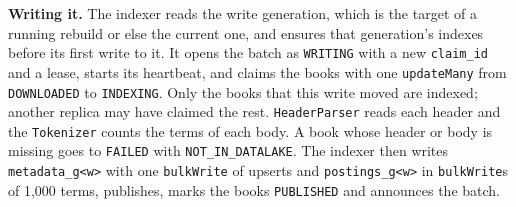 \documentclass[11pt,a4paper]{article}
\newcommand{\code}[1]{\nolinkurl{#1}}
\begin{document}
\textbf{Writing it.} The indexer reads the write generation, which is the target of a running rebuild or else the
current one, and ensures that generation's indexes before its first write to it. It opens the batch as \code{WRITING}
with a new \code{claim_id} and a lease, starts its heartbeat, and claims the books with one \code{updateMany} from
\code{DOWNLOADED} to \code{INDEXING}. Only the books that this write moved are indexed; another replica may have claimed
the rest. \code{HeaderParser} reads each header and the \code{Tokenizer} counts the terms of each body. A book whose
header or body is missing goes to \code{FAILED} with \code{NOT_IN_DATALAKE}. The indexer then writes \code{metadata_g<w>} with
one \code{bulkWrite} of upserts and \code{postings_g<w>} in \code{bulkWrite}s of 1{,}000 terms, publishes, marks the
books \code{PUBLISHED} and announces the batch.
\end{document}
